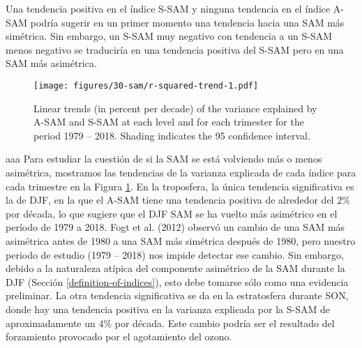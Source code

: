 \documentclass[12pt,oneside]{reedthesis}
\begin{document}
Una tendencia positiva en el índice S\nobreakdash-SAM y ninguna tendencia en el índice A\nobreakdash-SAM podría sugerir en un primer momento una tendencia hacia una SAM más simétrica.
Sin embargo, un S\nobreakdash-SAM muy negativo con tendencia a un S\nobreakdash-SAM menos negativo se traduciría en una tendencia positiva del S\nobreakdash-SAM pero en una SAM más asimétrica.
\begin{figure}
\centering
\texttt{[image: figures/30-sam/r-squared-trend-1.pdf]}
\caption{\label{fig:r-squared-trend}Linear trends (in percent per decade) of the variance explained by A-SAM and S-SAM at each level and for each trimester for the period 1979 -- 2018. Shading indicates the 95 confidence interval.}
\end{figure}
aaa
Para estudiar la cuestión de si la SAM se está volviendo más o menos asimétrica, mostramos las tendencias de la varianza explicada de cada índice para cada trimestre en la Figura \ref{fig:r-squared-trend}.
En la troposfera, la única tendencia significativa es la de DJF, en la que el A\nobreakdash-SAM tiene una tendencia positiva de alrededor del 2\% por década, lo que sugiere que el DJF SAM se ha vuelto más asimétrico en el período de 1979 a 2018.
Fogt et al. (2012) observó un cambio de una SAM más asimétrica antes de 1980 a una SAM más simétrica después de 1980, pero nuestro periodo de estudio (1979 -- 2018) nos impide detectar ese cambio.
Sin embargo, debido a la naturaleza atípica del componente asimétrico de la SAM durante la DJF (Sección \ref{definition-of-indices}), esto debe tomarse sólo como una evidencia preliminar.
La otra tendencia significativa se da en la estratosfera durante SON, donde hay una tendencia positiva en la varianza explicada por la S\nobreakdash-SAM de aproximadamente un 4\% por década.
Este cambio podría ser el resultado del forzamiento provocado por el agotamiento del ozono.
\end{document}
